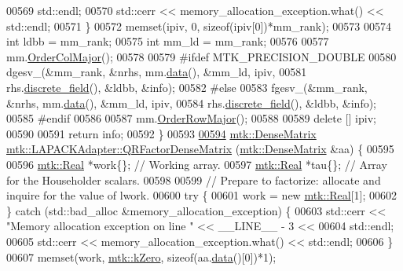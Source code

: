 \begin{DoxyCode}
00569       std::endl;
00570     std::cerr << memory\_allocation\_exception.what() << std::endl;
00571   \}
00572   memset(ipiv, 0, \textcolor{keyword}{sizeof}(ipiv[0])*mm\_rank);
00573 
00574   \textcolor{keywordtype}{int} ldbb = mm\_rank;
00575   \textcolor{keywordtype}{int} mm\_ld = mm\_rank;
00576 
00577   mm.\hyperlink{classmtk_1_1DenseMatrix_a59b9bea24acf39dca64e8549b3527463}{OrderColMajor}();
00578 
00579 \textcolor{preprocessor}{  #ifdef MTK\_PRECISION\_DOUBLE}
00580   dgesv\_(&mm\_rank, &nrhs, mm.\hyperlink{classmtk_1_1DenseMatrix_a0c33b8a9e01d157c61ddbdf807c25d84}{data}(), &mm\_ld, ipiv,
00581          rhs.\hyperlink{classmtk_1_1UniStgGrid2D_a3e72d59843a3f9c5e47da07e5850dfe0}{discrete\_field}(), &ldbb, &info);
00582 \textcolor{preprocessor}{  #else}
00583   fgesv\_(&mm\_rank, &nrhs, mm.\hyperlink{classmtk_1_1DenseMatrix_a0c33b8a9e01d157c61ddbdf807c25d84}{data}(), &mm\_ld, ipiv,
00584          rhs.\hyperlink{classmtk_1_1UniStgGrid2D_a3e72d59843a3f9c5e47da07e5850dfe0}{discrete\_field}(), &ldbb, &info);
00585 \textcolor{preprocessor}{  #endif}
00586 
00587   mm.\hyperlink{classmtk_1_1DenseMatrix_ac2949efba3e8278335d45418c85433e4}{OrderRowMajor}();
00588 
00589   \textcolor{keyword}{delete} [] ipiv;
00590 
00591   \textcolor{keywordflow}{return} info;
00592 \}
00593 
\hypertarget{mtk__lapack__adapter_8cc_source_l00594}{}\hyperlink{classmtk_1_1LAPACKAdapter_ae5c6e78c9c819c9ac7a6f31bfd011d7a}{00594} \hyperlink{classmtk_1_1DenseMatrix}{mtk::DenseMatrix} \hyperlink{classmtk_1_1LAPACKAdapter_ae5c6e78c9c819c9ac7a6f31bfd011d7a}{mtk::LAPACKAdapter::QRFactorDenseMatrix}
      (\hyperlink{classmtk_1_1DenseMatrix}{mtk::DenseMatrix} &aa) \{
00595 
00596   \hyperlink{group__c01-roots_gac080bbbf5cbb5502c9f00405f894857d}{mtk::Real} *work\{\}; \textcolor{comment}{// Working array.}
00597   \hyperlink{group__c01-roots_gac080bbbf5cbb5502c9f00405f894857d}{mtk::Real} *tau\{\};  \textcolor{comment}{// Array for the Householder scalars.}
00598 
00599   \textcolor{comment}{// Prepare to factorize: allocate and inquire for the value of lwork.}
00600   \textcolor{keywordflow}{try} \{
00601     work = \textcolor{keyword}{new} \hyperlink{group__c01-roots_gac080bbbf5cbb5502c9f00405f894857d}{mtk::Real}[1];
00602   \} \textcolor{keywordflow}{catch} (std::bad\_alloc &memory\_allocation\_exception) \{
00603     std::cerr << \textcolor{stringliteral}{"Memory allocation exception on line "} << \_\_LINE\_\_ - 3 <<
00604       std::endl;
00605     std::cerr << memory\_allocation\_exception.what() << std::endl;
00606   \}
00607   memset(work, \hyperlink{group__c01-roots_ga59a451a5fae30d59649bcda274fea271}{mtk::kZero}, \textcolor{keyword}{sizeof}(aa.\hyperlink{classmtk_1_1DenseMatrix_a0c33b8a9e01d157c61ddbdf807c25d84}{data}()[0])*1);

\end{DoxyCode}
